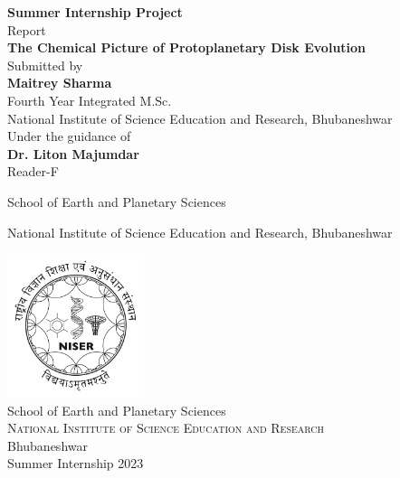 \begin{titlepage}

\begin{center}

\textup{\small {\bf Summer Internship Project} \\ Report}\\[0.3in]

\Large \textbf {The Chemical Picture of Protoplanetary Disk Evolution}\\[0.7in]


       

\normalsize Submitted by \\[0.2in]
\textbf{Maitrey Sharma}\\
Fourth Year Integrated M.Sc.\\
National Institute of Science Education and Research, Bhubaneshwar\\

\vspace{.2in}
Under the guidance of\\[0.2in]
\textbf{Dr. Liton Majumdar}\\
Reader-F

School of Earth and Planetary Sciences 

National Institute of Science Education and Research, Bhubaneshwar



\vspace{.3in}

\includegraphics[width=0.3\textwidth]{logo1.jpg}\\[0.1in]
\Large{School of Earth and Planetary Sciences}\\
\normalsize
\textsc{National Institute of Science Education and Research}\\
Bhubaneshwar \\
\vspace{0.2cm}
Summer Internship 2023

\end{center}

\end{titlepage}
